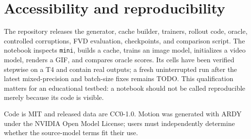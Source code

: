 \documentclass[10pt,twocolumn]{article}
\begin{document}
\section{Accessibility and reproducibility}
The repository releases the generator, cache builder, trainers, rollout code, oracle, controlled corruptions, FVD
evaluation, checkpoints, and comparison script. The notebook inspects \texttt{mini}, builds a cache, trains an image
model, initializes a video model, renders a GIF, and compares oracle scores. Its cells have been verified stepwise on a
T4 and contain real outputs; a fresh uninterrupted run after the latest mixed-precision and batch-size fixes remains
TODO. This qualification matters for an educational testbed: a notebook should not be called reproducible merely
because its code is visible.

Code is MIT and released data are CC0-1.0. Motion was generated with ARDY under the NVIDIA Open Model License; users
must independently determine whether the source-model terms fit their use.
\end{document}
